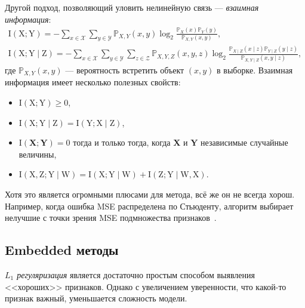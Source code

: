 \documentclass[12pt]{article}
\begin{document}
Другой подход, позволяющий уловить нелинейную связь --- \emph{взаимная информация}:
\begin{gather*}
    \operatorname{I(X; Y)}=-\sum_{x \in \mathcal{X}} \sum_{y \in \mathcal{Y}} \mathbb{P}_{X, Y}(x, y) \log _{2} \frac{\mathbb{P}_{X}(x) \mathbb{P}_{Y}(y)}{\mathbb{P}_{X, Y}(x, y)}, \\
    \operatorname{I(X; Y \mid Z)} = -\sum_{x \in \mathcal{X}} \sum_{y \in \mathcal{Y}} \sum_{z \in \mathcal{Z}} \mathbb{P}_{X, Y, Z}(x, y, z) \log _{2} \frac{\mathbb{P}_{X \mid Z}(x \mid z) \mathbb{P}_{Y \mid Z}(y \mid z)}{\mathbb{P}_{X, Y \mid Z}(x, y \mid z)},
\end{gather*}
где $\mathbb{P}_{X, Y}(x, y)$ --- вероятность встретить объект $(x, y)$ в выборке.
Взаимная информация имеет несколько полезных свойств:
\begin{itemize}[noitemsep]
    \item $\operatorname{I(X; Y)}\geq0$,
    \item $\operatorname{I(X; Y \mid Z)}=\operatorname{I(Y; X \mid Z)}$,
    \item $\operatorname{I(\mathbf{X}; \mathbf{Y})}=0$ тогда и только тогда, когда $\mathbf{X}$ и $\mathbf{Y}$ независимые случайные величины,
    \item $\operatorname{I(X, Z; Y \mid W)}=\operatorname{I(X; Y \mid W)}+\operatorname{I(Z; Y \mid W, X)}$.
\end{itemize}
Хотя это является огромными плюсами для метода, всё же он не всегда хорош. Например, когда ошибка MSE распределена по Стьюденту, алгоритм выбирает нелучшие с точки зрения MSE подмножества признаков~\citep{MI_cons}.


\subsection{Embedded методы}
\emph{$L_1$ регуляризация} является достаточно простым способом выявления <<хороших>> признаков. Однако с увеличением уверенности, что какой-то признак важный, уменьшается сложность модели.  
\end{document}

